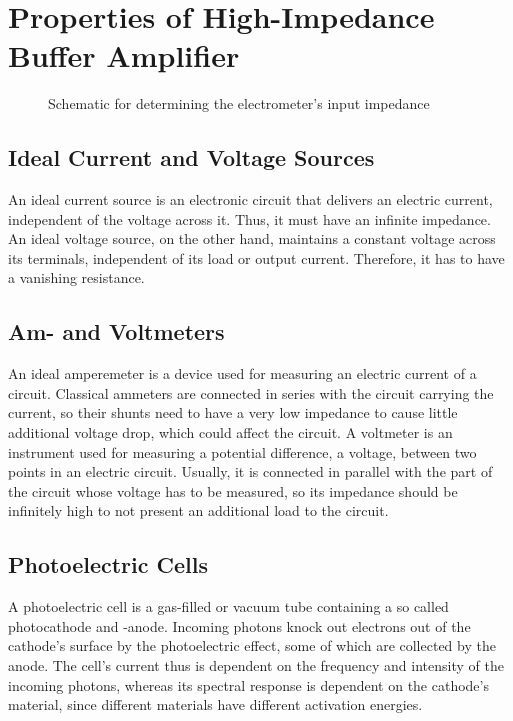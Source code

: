 \chapter{Properties of High-Impedance Buffer Amplifier}
\begin{figure}
	\centering
	\caption{Schematic for determining the electrometer's input impedance}
	\label{fig:elec_in_im}
\end{figure}

\section{Ideal Current and Voltage Sources}
An ideal current source is an electronic circuit that delivers an electric current, independent of the voltage across it.
Thus, it must have an infinite impedance.
An ideal voltage source, on the other hand, maintains a constant voltage across its terminals, independent of its load or output current.
Therefore, it has to have a vanishing resistance.

\section{Am- and Voltmeters}
An ideal amperemeter is a device used for measuring an electric current of a circuit.
Classical ammeters are connected in series with the circuit carrying the current, so their shunts need to have a very low impedance to cause little additional voltage drop, which could affect the circuit.
A voltmeter is an instrument used for measuring a potential difference, a voltage, between two points in an electric circuit.
Usually, it is connected in parallel with the part of the circuit whose voltage has to be measured, so its impedance should be infinitely high to not present an additional load to the circuit.

\section{Photoelectric Cells}
A photoelectric cell is a gas-filled or vacuum tube containing a so called photocathode and -anode.
Incoming photons knock out electrons out of the cathode's surface by the photoelectric effect, some of which are collected by the anode.%
The cell's current thus is dependent on the frequency and intensity of the incoming photons, whereas its spectral response is dependent on the cathode's material, since different materials have different activation energies.

